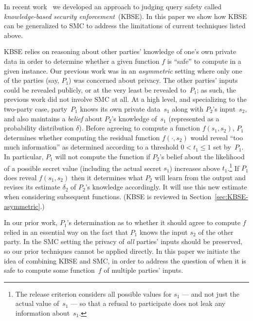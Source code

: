 \documentclass[10pt]{sigplanconf}
\begin{document}
In recent work~\cite{mardziel11belief} we developed an approach
to judging query safety called \emph{knowledge-based security
  enforcement}~(KBSE).  In this paper we show how KBSE can be
generalized to SMC to address the limitations of current techniques
listed above.  

KBSE relies on reasoning about other parties' knowledge of one's own
private data in order to determine whether a given function $f$ is
``safe'' to compute in a given instance.  Our previous work was in an
\emph{asymmetric} setting where only one of the parties (say, $P_1$)
was concerned about privacy.  The other parties' inputs could be
revealed publicly, or at the very least be revealed to~$P_1$; as such,
the previous work did not involve SMC at all.  At a high level, and
specializing to the two-party case, party~$P_1$ knows its own
private data~$s_1$ along with $P_2$'s input~$s_2$, and also maintains
a \emph{belief} about $P_2$'s knowledge of~$s_1$ (represented as a
probability distribution $\delta$).  Before agreeing to compute a
function $f(s_1, s_2)$, $P_1$ determines whether computing the
residual function $f(\cdot, s_2)$ would reveal ``too much
information'' as determined according to a threshold $ 0 < t_1 \leq 1
$ set by~$P_1$.  In particular, $P_1$ will not compute the function if
$P_2$'s belief about the likelihood of a possible secret value
(including the actual secret $s_1$) increases above
$t_1$.\footnote{The release criterion considers all possible values
  for $s_1$ --- and not just the actual value of~$s_1$ --- so that a
  refusal to participate does not leak any information about~$s_1$.}
If $P_1$ does reveal $f(s_1,s_2)$ then it determines what $P_2$ will
learn from the output and revises its estimate $\delta_2$ of $P_2$'s
knowledge accordingly.  It will use this new estimate when considering
subsequent functions.  (KBSE is reviewed in
Section~\ref{sec:KBSE-asymmetric}.)

In our prior work, $P_1$'s determination as to whether it should agree
to compute $f$ relied in an essential way on the fact that $P_1$ knows
the input $s_2$ of the other party. In the SMC setting the privacy of
\emph{all} parties' inputs should be preserved, so our prior
techniques cannot be applied directly.
In this paper we initiate the idea of combining KBSE and SMC, in order
to address the question of when it is safe to compute some
function~$f$ of multiple parties' inputs. 
\end{document}
